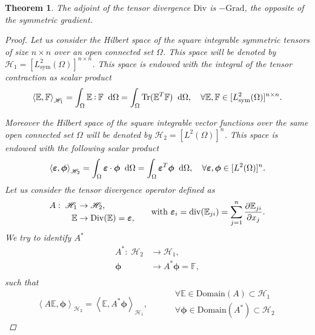 \documentclass[preprint,12pt]{elsarticle}
\DeclareMathOperator{\Tr}{Tr}
\newtheorem{theorem}{Theorem}
\def\onedot{$\mathsurround0pt\ldotp$}
\def\cddot{%
	\mathbin{\vcenter{\baselineskip.67ex
			\hbox{\onedot}\hbox{\onedot}}%
}}
\begin{document}
\begin{theorem}{The adjoint of the tensor divergence $\mathrm{Div}$ is $- \mathrm{Grad}$, the opposite of the symmetric gradient.}
	\begin{proof}
	Let us consider the Hilbert space of the square integrable symmetric tensors of size $n \times n$ over an open connected set $\Omega$. This space will be denoted by $\mathscr{H}_1 = [L^2_{\text{sym}}(\Omega)]^{n \times n}$. This space is endowed with the integral of the tensor contraction as scalar product
	\[\left\langle \mathbb{E} , \mathbb{F} \right\rangle_{\mathscr{H}_1} = \int_{\Omega}  \mathbb{E} \cddot \mathbb{F} \; \d\Omega = \int_{\Omega} \Tr(\mathbb{E}^T \mathbb{F}) \; \d\Omega, \quad \forall \mathbb{E} , \mathbb{F} \in [L^2_{\text{sym}}(\Omega)]^{n \times n}. \]
	
	 Moreover the Hilbert space of the square integrable vector functions over the same open connected set $\Omega$ will be denoted by $\mathscr{H}_2 = [L^2(\Omega)]^n$. This space is endowed with the following scalar product
	 \[\left\langle \bm{\varepsilon} , \bm{\phi} \right\rangle_{\mathscr{H}_2} = \int_{\Omega}  \bm{\varepsilon} \cdot \bm{\phi} \; \d\Omega = \int_{\Omega} \bm{\varepsilon}^T \bm{\phi}\; \d\Omega, \quad \forall \bm{\varepsilon}, \bm{\phi} \in [L^2(\Omega)]^{n}. \]
	 Let us consider the tensor divergence operator defined as 
	 \[
	 \begin{aligned}
	 A: \; \mathscr{H}_1& \rightarrow \mathscr{H}_2, \\
	 \mathbb{E}& \rightarrow \mathrm{Div}(\mathbb{E}) = \bm{\varepsilon}, \\
	 \end{aligned}
	 \qquad \text{with } \bm{\varepsilon}_i = \mathrm{div}(\mathbb{E}_{ji}) = \sum_{j = 1}^n \diffp{\mathbb{E}_{ji}}{x_j}.
	 \]
	 We try to identify $A^*$
	 \[
	 \begin{aligned}
	 A^*: \; \mathscr{H}_2& \rightarrow \mathscr{H}_1, \\
	 \bm{\phi}& \rightarrow  A^* \bm{\phi} = \mathbb{F}, \\
	 \end{aligned}
	 \]
	 such that \[
	 	 \left\langle A \mathbb{E} , \bm{\phi} \right\rangle_{\mathscr{H}_2} = \left\langle \mathbb{E} , A^* \bm{\phi} \right\rangle_{\mathscr{H}_1},
	 \begin{aligned} \qquad
	 &\forall \mathbb{E} \in \mathrm{Domain}(A) \subset \mathscr{H}_1 \\
	 &\forall \bm{\phi} \in \mathrm{Domain}(A^*) \subset \mathscr{H}_2
	 \end{aligned}
\]
\end{proof}
\end{theorem}
\end{document}
